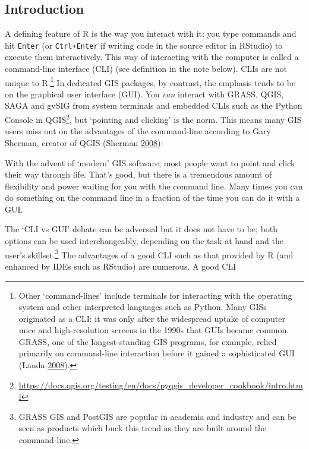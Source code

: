 \documentclass[]{krantz}
\let\rmarkdownfootnote\footnote%
\def\footnote{\protect\rmarkdownfootnote}
\renewenvironment{quote}{\begin{VF}}{\end{VF}}
\renewcommand{\href}[2]{#2\footnote{\url{#1}}}
\begin{document}
\hypertarget{introduction-6}{%
\subsection{Introduction}\label{introduction-6}}

A defining feature of R is the way you interact with it:
you type commands and hit \texttt{Enter} (or \texttt{Ctrl+Enter} if writing code in the source editor in RStudio) to execute them interactively.
This way of interacting with the computer is called a command-line interface (CLI) (see definition in the note below).
CLIs are not unique to R.\footnote{Other `command-lines' include terminals for interacting with the operating system and other interpreted languages such as Python.
  Many GISs originated as a CLI:
  it was only after the widespread uptake of computer mice and high-resolution screens in the 1990s that GUIs became common.
  GRASS, one of the longest-standing GIS programs, for example, relied primarily on command-line interaction before it gained a sophisticated GUI (Landa \protect\hyperlink{ref-landa_new_2008}{2008}).}
In dedicated GIS packages, by contrast, the emphasis tends to be on the graphical user interface (GUI).
You \emph{can} interact with GRASS, QGIS, SAGA and gvSIG from system terminals and embedded CLIs such as the \href{https://docs.qgis.org/testing/en/docs/pyqgis_developer_cookbook/intro.html}{Python Console in QGIS}, but `pointing and clicking' is the norm.
This means many GIS users miss out on the advantages of the command-line according to Gary Sherman, creator of QGIS (Sherman \protect\hyperlink{ref-sherman_desktop_2008}{2008}):

\begin{quote}
With the advent of `modern' GIS software, most people want to point and
click their way through life. That's good, but there is a tremendous amount
of flexibility and power waiting for you with the command line. Many times
you can do something on the command line in a fraction of the time you
can do it with a GUI.
\end{quote}

The `CLI vs GUI' debate can be adversial but it does not have to be; both options can be used interchangeably, depending on the task at hand and the user's skillset.\footnote{GRASS GIS and PostGIS are popular in academia and industry and can be seen as products which buck this trend as they are built around the command-line.
}
The advantages of a good CLI such as that provided by R (and enhanced by IDEs such as RStudio) are numerous.
A good CLI
\end{document}
